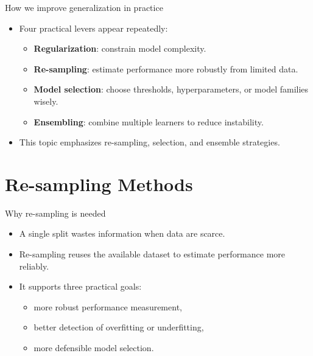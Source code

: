 \documentclass[12pt]{beamer}
\begin{document}
\begin{frame}{How we improve generalization in practice}
  \begin{itemize}
    \item Four practical levers appear repeatedly:
      \begin{itemize}
        \item \textbf{Regularization}: constrain model complexity.
        \item \textbf{Re-sampling}: estimate performance more robustly from limited data.
        \item \textbf{Model selection}: choose thresholds, hyperparameters, or model families wisely.
        \item \textbf{Ensembling}: combine multiple learners to reduce instability.
      \end{itemize}
    \item This topic emphasizes re-sampling, selection, and ensemble strategies.
  \end{itemize}
\end{frame}

\section{Re-sampling Methods}

\begin{frame}{Why re-sampling is needed}
  \begin{itemize}
    \item A single split wastes information when data are scarce.
    \item Re-sampling reuses the available dataset to estimate performance more reliably.
    \item It supports three practical goals:
      \begin{itemize}
        \item more robust performance measurement,
        \item better detection of overfitting or underfitting,
        \item more defensible model selection.
      \end{itemize}
  \end{itemize}
\end{frame}
\end{document}

